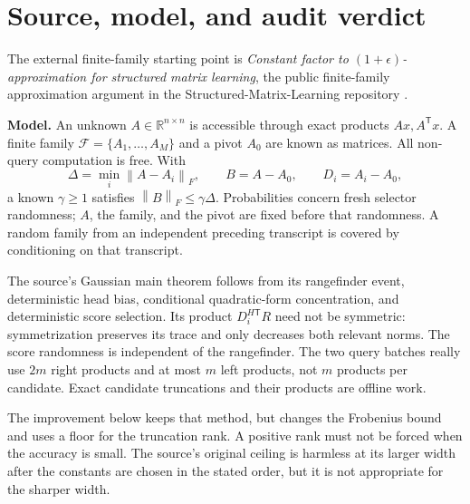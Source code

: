\documentclass[11pt,oneside,openany,a4paper]{book}
\numberwithin{equation}{chapter}
\theoremstyle{definition}
\theoremstyle{remark}
\newcommand{\R}{\mathbb R}\newcommand{\E}{\mathbb E}\newcommand{\Prb}{\mathbb P}\newcommand{\PP}{\mathbb P}
\newcommand{\T}{\mathsf T}\newcommand{\Id}{I}
\newcommand{\F}[1]{\left\lVert#1\right\rVert_F}
\begin{document}
\section{Source, model, and audit verdict}
The external finite-family starting point is \emph{Constant factor to $(1+\epsilon)$-approximation for structured matrix learning}, the public finite-family approximation argument in the Structured-Matrix-Learning repository \cite{Note}. \par
\noindent\textbf{Model.} An unknown $A\in\R^{n\times n}$ is accessible through exact products $Ax,A^\T x$. A finite family $\mathcal F=\{A_1,\ldots,A_M\}$ and a pivot $A_0$ are known as matrices. All non-query computation is free. With
\[
\Delta=\min_i\F{A-A_i},\qquad B=A-A_0,\qquad D_i=A_i-A_0,
\]
a known $\gamma\ge1$ satisfies $\F B\le\gamma\Delta$. Probabilities concern fresh selector randomness; $A$, the family, and the pivot are fixed before that randomness. A random family from an independent preceding transcript is covered by conditioning on that transcript.

The source's Gaussian main theorem follows from its rangefinder event, deterministic head bias, conditional quadratic-form concentration, and deterministic score selection. Its product $D_i^{H\T}R$ need not be symmetric: symmetrization preserves its trace and only decreases both relevant norms. The score randomness is independent of the rangefinder. The two query batches really use $2m$ right products and at most $m$ left products, not $m$ products per candidate. Exact candidate truncations and their products are offline work.

The improvement below keeps that method, but changes the Frobenius bound and uses a floor for the truncation rank. A positive rank must not be forced when the accuracy is small. The source's original ceiling is harmless at its larger width after the constants are chosen in the stated order, but it is not appropriate for the sharper width.
\end{document}
